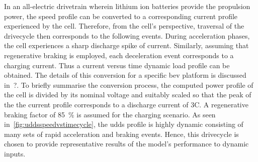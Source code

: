 In  an  all-electric  drivetrain  wherein  lithium  ion  batteries  provide  the
propulsion power, the speed profile can  be converted to a corresponding current
profile  experienced  by  the  cell. Therefore,  from  the  cell's  perspective,
traversal of  the drivecycle  then corresponds to  the following  events. During
acceleration phases,  the cell experiences  a sharp discharge spike  of current.
Similarly,  assuming that  regenerative braking  is employed,  each deceleration
event corresponds to a charging current. Thus a current versus time dynamic load
profile can be obtained. The details of this conversion for a specific \gls{bev}
platform is  discussed in~?. To
briefly summarise the conversion process, the computed power profile of the cell
is divided by  its nominal voltage and  suitably scaled so that the  peak of the
the current  profile corresponds to  a discharge  current of 3C.  A regenerative
braking  factor  of \SI{85}{\percent}  is  assumed  for the  charging  scenario.
As  seen in~\cref{fig:uddsspeedvstimecycle},  the \gls{udds}  profile is  highly
dynamic consisting of many sets of rapid acceleration and braking events. Hence,
this  drivecycle is  chosen to  provide  representative results  of the  model's
performance to dynamic inputs.

